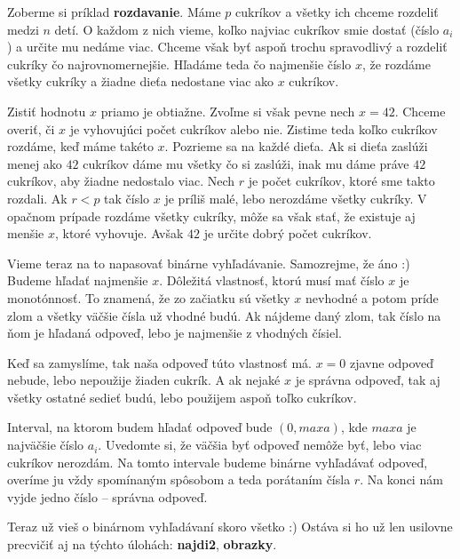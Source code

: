 Zoberme si príklad \textbf{rozdavanie}. Máme $p$ cukríkov a všetky ich chceme rozdeliť medzi $n$
detí. O každom z nich vieme, koľko najviac cukríkov smie dostať (číslo $a_i$) a určite mu nedáme
viac. Chceme však byť aspoň trochu spravodlivý a rozdeliť cukríky čo najrovnomernejšie. Hľadáme teda
čo najmenšie číslo $x$, že rozdáme všetky cukríky a žiadne dieťa nedostane viac ako $x$ cukríkov.

Zistiť hodnotu $x$ priamo je obtiažne. Zvoľme si však pevne nech $x = 42$. Chceme overiť, či $x$ je
vyhovujúci počet cukríkov alebo nie. Zistime teda koľko cukríkov rozdáme, keď máme takéto $x$.
Pozrieme sa na každé dieťa. Ak si dieťa zaslúži menej ako $42$ cukríkov dáme mu všetky čo si
zaslúži, inak mu dáme práve $42$ cukríkov, aby žiadne nedostalo viac. Nech $r$ je počet cukríkov,
ktoré sme takto rozdali. Ak $r < p$ tak číslo $x$ je príliš malé, lebo nerozdáme všetky cukríky. V
opačnom prípade rozdáme všetky cukríky, môže sa však stať, že existuje aj menšie $x$, ktoré
vyhovuje. Avšak $42$ je určite dobrý počet cukríkov.

Vieme teraz na to napasovať binárne vyhľadávanie. Samozrejme, že áno :) Budeme hľadať najmenšie $x$.
Dôležitá vlastnosť, ktorú musí mať číslo $x$ je monotónnosť. To znamená, že zo začiatku sú všetky
$x$ nevhodné a potom príde zlom a všetky väčšie čísla už vhodné budú. Ak nájdeme daný zlom, tak
číslo na ňom je hľadaná odpoveď, lebo je najmenšie z vhodných čísiel.

Keď sa zamyslíme, tak naša odpoveď túto vlastnosť má. $x = 0$ zjavne odpoveď nebude, lebo nepoužije
žiaden cukrík. A ak nejaké $x$ je správna odpoveď, tak aj všetky ostatné sedieť budú, lebo použijem
aspoň toľko cukríkov.

Interval, na ktorom budem hľadať odpoveď bude $(0, maxa)$, kde $maxa$ je najväčšie číslo $a_i$.
Uvedomte si, že väčšia byť odpoveď nemôže byť, lebo viac cukríkov nerozdám. Na tomto intervale
budeme binárne vyhľadávať odpoveď, overíme ju vždy spomínaným spôsobom a teda porátaním čísla $r$.
Na konci nám vyjde jedno číslo -- správna odpoveď.

\medskip

Teraz už vieš o binárnom vyhľadávaní skoro všetko :) Ostáva si ho už len usilovne precvičiť aj na
týchto úlohách: \textbf{najdi2}, \textbf{obrazky}.


